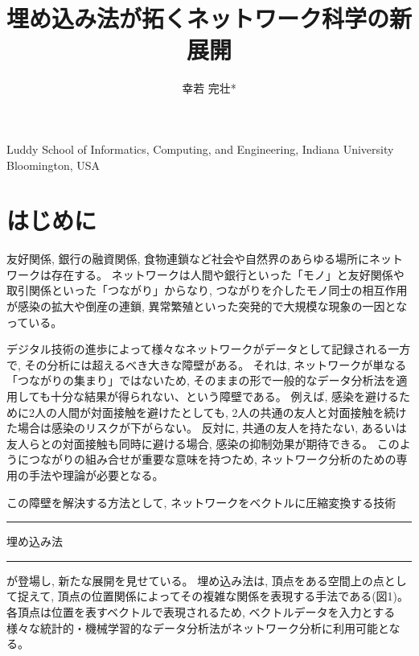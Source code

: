 \documentclass[J]{scitrans}
\def\ddash{\rule[0.33zh]{2zw}{.03zh}}
\begin{document}
\title{埋め込み法が拓くネットワーク科学の新展開}
\author{幸若 完壮*}


\maketitle


\address{*}{Luddy School of Informatics, Computing, and Engineering, Indiana University Bloomington, USA}


\section{はじめに}
\label{sec:introduction}

友好関係, 銀行の融資関係, 食物連鎖など社会や自然界のあらゆる場所にネットワークは存在する。
ネットワークは人間や銀行といった「モノ」と友好関係や取引関係といった「つながり」からなり, 
つながりを介したモノ同士の相互作用が感染の拡大や倒産の連鎖, 異常繁殖といった突発的で大規模な現象の一因となっている\cite{}。

デジタル技術の進歩によって様々なネットワークがデータとして記録される一方で, その分析には超えるべき大きな障壁がある。
それは, ネットワークが単なる「つながりの集まり」ではないため, そのままの形で一般的なデータ分析法を適用しても十分な結果が得られない、という障壁である。
例えば, 感染を避けるために2人の人間が対面接触を避けたとしても, 2人の共通の友人と対面接触を続けた場合は感染のリスクが下がらない。
反対に, 共通の友人を持たない, あるいは友人らとの対面接触も同時に避ける場合, 感染の抑制効果が期待できる。
このようにつながりの組み合せが重要な意味を持つため, ネットワーク分析のための専用の手法や理論が必要となる。

この障壁を解決する方法として, ネットワークをベクトルに圧縮変換する技術\ddash 埋め込み法\ddash が登場し, 新たな展開を見せている。
埋め込み法は, 頂点をある空間上の点として捉えて, 頂点の位置関係によってその複雑な関係を表現する手法である(図1)。
各頂点は位置を表すベクトルで表現されるため, ベクトルデータを入力とする様々な統計的・機械学習的なデータ分析法がネットワーク分析に利用可能となる。
\end{document}
